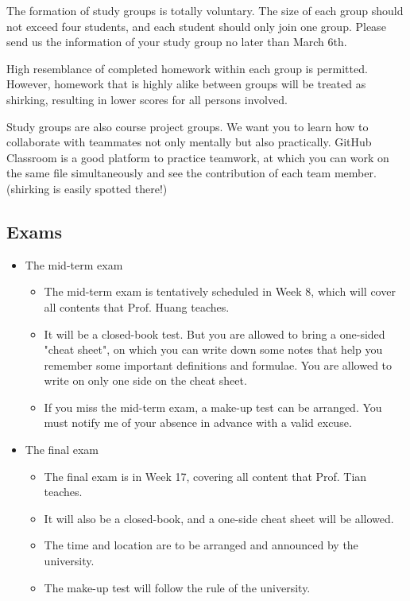 \documentclass[a4paper,11pt]{article}
\begin{document}
The formation of study groups is totally voluntary. The size of each
group should not exceed four students, and each student should only
join one group. Please send us the information of your study group no
later than March 6th.

High resemblance of completed homework within each group is
permitted. However, homework that is highly alike between groups will
be treated as shirking, resulting in lower scores for all persons
involved.

Study groups are also course project groups. We want you to learn how
to collaborate with teammates not only mentally but also
practically. GitHub Classroom is a good platform to practice teamwork,
at which you can work on the same file simultaneously and see the
contribution of each team member. (shirking is easily spotted there!)


\subsection*{Exams}
\label{sec:org2e0b443}

\begin{itemize}
\item The mid-term exam
\label{sec:orgca8e066}
\begin{itemize}
\item The mid-term exam is tentatively scheduled in Week 8, which will
cover all contents that Prof. Huang teaches.
\item It will be a closed-book test. But you are allowed to bring a
one-sided "cheat sheet", on which you can write down some notes that
help you remember some important definitions and formulae. You are
allowed to write on only one side on the cheat sheet.
\item If you miss the mid-term exam, a make-up test can be arranged. You
must notify me of your absence in advance with a valid excuse.
\end{itemize}

\item The final exam
\label{sec:orge153766}
\begin{itemize}
\item The final exam is in Week 17, covering all content that Prof. Tian
teaches.
\item It will also be a closed-book, and a one-side cheat sheet will be
allowed.
\item The time and location are to be arranged and announced by the
university.
\item The make-up test will follow the rule of the university.
\end{itemize}
\end{itemize}
\end{document}
